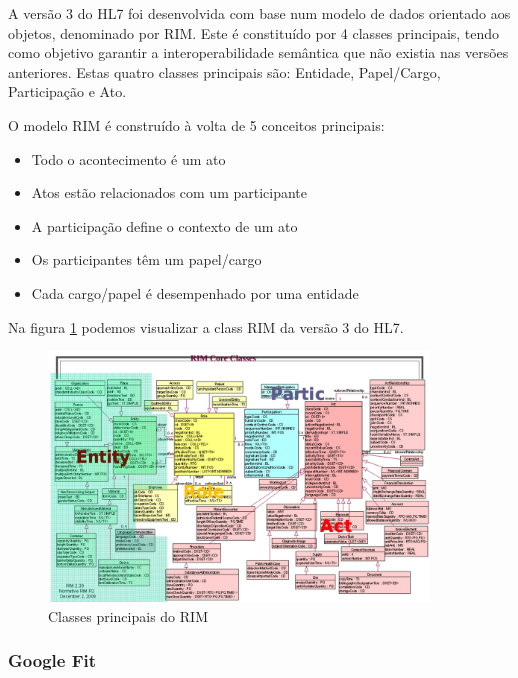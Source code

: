 A versão 3 do HL7 foi desenvolvida com base num modelo de dados orientado aos objetos, denominado por \gls{RIM}. Este é constituído por 4 classes principais, tendo como objetivo garantir a interoperabilidade semântica que não existia nas versões anteriores. Estas quatro classes principais são: Entidade, Papel/Cargo, Participação e Ato\cite{hl7-rim}.
\par 
O modelo \gls{RIM} é construído à volta de 5 conceitos principais:
\begin{itemize}
  \item Todo o acontecimento é um ato
  \item Atos estão relacionados com um participante
  \item A participação define o contexto de um ato
  \item Os participantes têm um papel/cargo
  \item Cada cargo/papel é desempenhado por uma entidade
\end{itemize}

Na figura \ref{f:rimclass} podemos visualizar a class \gls{RIM} da versão 3 do HL7.

\begin{figure}[H]
  \centering
  \includegraphics[width=0.9\textwidth]{imgs/hl7-rim.png}
  \caption[Classes principais do \gls{RIM}]{Classes principais do \gls{RIM} \cite{hl7-rim}}
  
  \label{f:rimclass}
\end{figure}


\subsubsection{Google Fit}

